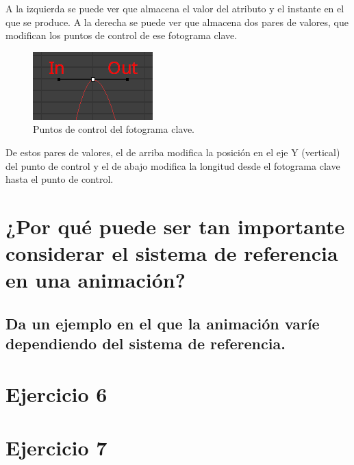 \documentclass[draft]{article}
\begin{document}
A la izquierda se puede ver que almacena el valor del atributo y el instante en el que se produce. A la derecha se puede ver que almacena dos pares de valores, que modifican los puntos de control de ese fotograma clave.

\begin{figure}[H]
    \centering
    \includegraphics[width=\textwidth]{imagenes/4-2.png}
    \caption{Puntos de control del fotograma clave.}
\end{figure}

De estos pares de valores, el de arriba modifica la posición en el eje Y (vertical) del punto de control y el de abajo modifica la longitud desde el fotograma clave hasta el punto de control.

\section{¿Por qué puede ser tan importante considerar el sistema de referencia en una animación?}

\subsection{Da un ejemplo en el que la animación varíe dependiendo del sistema de referencia.}
\section{Ejercicio 6}
\section{Ejercicio 7}
\end{document}
